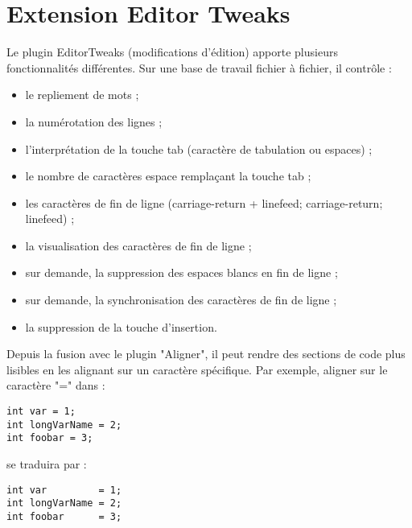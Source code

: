 \section{Extension Editor Tweaks}\label{sec:editor_tweaks}

Le plugin EditorTweaks (modifications d'édition) apporte plusieurs fonctionnalités différentes. Sur une base de travail fichier à fichier, il contrôle :

\begin{itemize}[noitemsep]
\item le repliement de mots ;
\item la numérotation des lignes ;
\item l'interprétation de la touche tab (caractère de tabulation ou espaces) ;
\item le nombre de caractères espace remplaçant la touche tab ;
\item les caractères de fin de ligne (carriage-return + linefeed; carriage-return; linefeed) ;
\item la visualisation des caractères de fin de ligne ;
\item sur demande, la suppression des espaces blancs en fin de ligne ;
\item sur demande, la synchronisation des caractères de fin de ligne ;
\item la suppression de la touche d'insertion.
\end{itemize}

Depuis la fusion avec le plugin "Aligner", il peut rendre des sections de code plus lisibles en les alignant sur un caractère spécifique.\newline
Par exemple, aligner sur le caractère "=" dans :

\begin{lstlisting}
int var = 1;
int longVarName = 2;
int foobar = 3;
\end{lstlisting}

se traduira par :

\begin{lstlisting}
int var         = 1;
int longVarName = 2;
int foobar      = 3;
\end{lstlisting}
